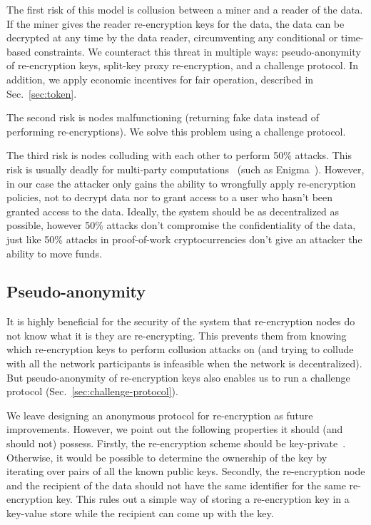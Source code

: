 \documentclass[longbibliography,nofootinbib]{revtex4-1}
\begin{document}
\begin{CJK*}{UTF8}{gbsn}
The first risk of this model is collusion between a miner and a reader of the data.
If the miner gives the reader re-encryption keys for the data,
the data can be decrypted at any time by the data reader, circumventing any conditional or time-based constraints.
We counteract this threat in multiple ways: pseudo-anonymity of re-encryption keys, split-key proxy re-encryption, and a challenge protocol.
In addition, we apply economic incentives for fair operation, described in Sec.~\ref{sec:token}.

The second risk is nodes malfunctioning (returning fake data instead of performing re-encryptions).
We solve this problem using a challenge protocol.

The third risk is nodes colluding with each other to perform 50\% attacks.
This risk is usually deadly for multi-party computations~\cite{vitalik-secret-dao} (such as Enigma~\cite{enigma}). However, in our case the attacker only gains the ability to wrongfully apply re-encryption policies, not to decrypt data nor to grant access to a user who hasn't been granted access to the data.
Ideally, the system should be as decentralized as possible, however 50\% attacks don't compromise the confidentiality of the data, just like 50\% attacks in
proof-of-work cryptocurrencies don't give an attacker the ability to move funds.

\subsection{Pseudo-anonymity}
\label{sec:anonymity}

It is highly beneficial for the security of the system that re-encryption nodes do not know what it is they are re-encrypting.
This prevents them from knowing which re-encryption keys to perform collusion attacks on (and trying to collude with all the network participants
is infeasible when the network is decentralized).
But pseudo-anonymity of re-encryption keys also enables us to run a challenge protocol (Sec.~\ref{sec:challenge-protocol}).

We leave designing an anonymous protocol for re-encryption as future improvements.
However, we point out the following properties it should (and should not) possess.
Firstly, the re-encryption scheme should be key-private~\cite{Ateniese-key-private,lwe-reencryption}.
Otherwise, it would be possible to determine the ownership of the key by iterating over pairs of all the known public keys.
Secondly, the re-encryption node and the recipient of the data should not have the same identifier for the same re-encryption key.
This rules out a simple way of storing a re-encryption key in a key-value store while the recipient can come up with the key.


\end{CJK*}
\end{document}
